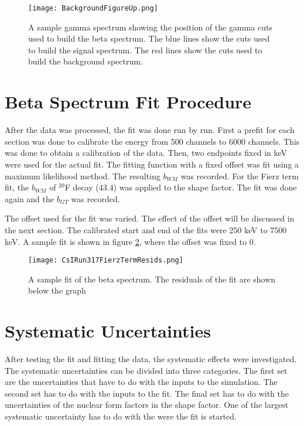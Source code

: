 \documentclass[../MaxHughesThesis.tex]{subfiles}
\begin{document}
\begin{figure}[!htb]
        \centerline{\texttt{[image: BackgroundFigureUp.png]}}
        \caption{A sample gamma spectrum showing the position of the gamma cuts used to build the beta spectrum.
		 The blue lines show the cuts used to build the signal spectrum.
		 The red lines show the cuts used to build the background spectrum.
                   }
        \label{fig:backgroundsubbeta}
\end{figure}


\section{Beta Spectrum Fit Procedure}
After the data was processed, the fit was done run by run.
First a prefit for each section was done to calibrate the energy from 500 channels to 6000 channels.
This was done to obtain a calibration of the data.
Then, two endpoints fixed in keV were used for the actual fit.
The fitting function with a fixed offset was fit using a maximum likelihood method.
The resulting $b_{WM}$ was recorded.
For the Fierz term fit, the $b_{WM}$ of $^{20}$F decay (43.4) was applied to the shape factor.
The fit was done again and the $b_{GT}$ was recorded.

The offset used for the fit was varied.
The effect of the offset will be discussed in the next section. 
The calibrated start and end of the fits were 250 keV to 7500 keV. 
A sample fit is shown in figure \ref{fig:samplefit}, where the offset was fixed to 0.

\begin{figure}[!htb]
	\centerline{\texttt{[image: CsIRun317FierzTermResids.png]}}
	\caption{A sample fit of the beta spectrum. 
		 The residuals of the fit are shown below the graph}
	\label{fig:samplefit}
\end{figure}

\section{Systematic Uncertainties}

After testing the fit and fitting the data, the systematic effects were investigated.
The systematic uncertainties can be divided into three categories.
The first set are the uncertainties that have to do with the inputs to the simulation.
The second set has to do with the inputs to the fit.
The final set has to do with the uncertainties of the nuclear form factors in the shape factor. 
One of the largest systematic uncertainty has to do with the were the fit is started. 
\end{document}
